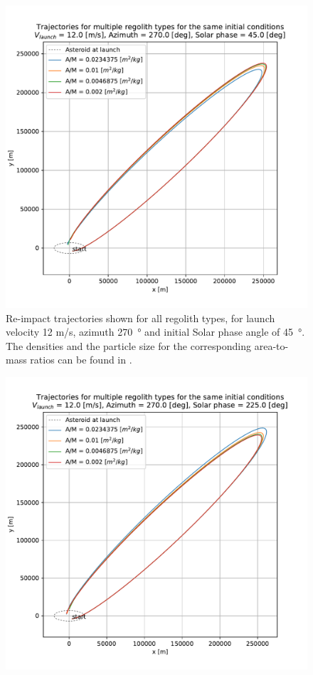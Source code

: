 \documentclass[print]{tudelft-report}
\begin{document}
\begin{appendices}
\begin{figure}[htb]
    \includegraphics[width=\textwidth, height=0.5\textheight, keepaspectratio=true]{Results/Images/trailing_edge_perturbations/reimpact_traj_12ms_270Azim_45solarPhase.pdf}
    \caption{Re-impact trajectories shown for all regolith types, for launch velocity 12 m/s, azimuth \SI{270}{\degree} and initial Solar phase angle of \SI{45}{\degree}. The densities and the particle size for the corresponding area-to-mass ratios can be found in .}
    \label{fig:trailingEdge_reimpact_traj_12ms_270azim_45solar}
    \end{figure}
    \FloatBarrier
    \begin{figure}[htb]
    \centering
    \captionsetup{justification=centering}
    \includegraphics[width=\textwidth, height=0.5\textheight, keepaspectratio=true]{Results/Images/trailing_edge_perturbations/reimpact_traj_12ms_270Azim_225solarPhase.pdf}

\end{figure}
\end{appendices}
\end{document}
